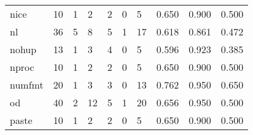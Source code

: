 \begin{longtable}{lp{2.0cm}p{2.0cm}p{2.0cm}p{2.0cm}p{2.0cm}p{2.0cm}p{2.0cm}p{2.0cm}p{2.0cm}}
nice      &                     10 &                                             1 &                                            2 &                                           2 &                                            0 &                                          5 &                                0.650 &                                  0.900 &                                0.500 \\
nl        &                     36 &                                             5 &                                            8 &                                           5 &                                            1 &                                         17 &                                0.618 &                                  0.861 &                                0.472 \\
nohup     &                     13 &                                             1 &                                            3 &                                           4 &                                            0 &                                          5 &                                0.596 &                                  0.923 &                                0.385 \\
nproc     &                     10 &                                             1 &                                            2 &                                           2 &                                            0 &                                          5 &                                0.650 &                                  0.900 &                                0.500 \\
numfmt    &                     20 &                                             1 &                                            3 &                                           3 &                                            0 &                                         13 &                                0.762 &                                  0.950 &                                0.650 \\
od        &                     40 &                                             2 &                                           12 &                                           5 &                                            1 &                                         20 &                                0.656 &                                  0.950 &                                0.500 \\
paste     &                     10 &                                             1 &                                            2 &                                           2 &                                            0 &                                          5 &                                0.650 &                                  0.900 &                                0.500 \\

\end{longtable}
